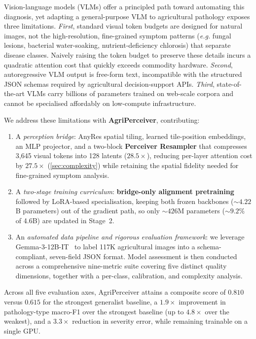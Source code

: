 \documentclass[runningheads]{llncs}
\newcommand{\ours}{AgriPerceiver}
\newcommand{\eg}{\textit{e.g.}}
\begin{document}
Vision-language models (VLMs) offer a principled path toward automating
this diagnosis, yet adapting a general-purpose VLM to agricultural pathology exposes three limitations.
\emph{First}, standard visual token budgets are designed for natural images, not the high-resolution, fine-grained symptom patterns (\eg{} fungal lesions, bacterial water-soaking, nutrient-deficiency chlorosis) that separate disease classes. Naively raising the token budget to preserve these details incurs a quadratic attention cost that quickly exceeds commodity hardware. \emph{Second}, autoregressive VLM output is free-form text, incompatible with the structured JSON schemas required by agricultural decision-support APIs. \emph{Third}, state-of-the-art VLMs carry billions of parameters trained on web-scale corpora and cannot be specialised affordably on low-compute infrastructure.

We address these limitations with \textbf{\ours{}}, contributing:

\begin{enumerate}[leftmargin=*,topsep=2pt,itemsep=2pt]
  \item A \emph{perception bridge}: AnyRes spatial tiling, learned
        tile-position embeddings, an MLP projector, and a two-block \textbf{Perceiver Resampler} that compresses 3,645 visual tokens into 128 latents ($28.5\times$), reducing per-layer attention cost by $27.5\times$ (\cref{sec:complexity}) while retaining the spatial fidelity needed for fine-grained symptom analysis.

  \item A \emph{two-stage training curriculum}: \textbf{bridge-only alignment
        pretraining} followed by LoRA-based specialisation, keeping both
        frozen backbones (${\sim}4.22$B parameters) out of the gradient
        path, so only ${\sim}426$M parameters (${\sim}9.2\%$ of 4.6B) are
        updated in Stage~2.

  \item An \emph{automated data pipeline and rigorous evaluation framework}:
        we leverage Gemma-3-12B-IT~\cite{gemmateam2025gemma3} to label 117K agricultural
        images into a schema-compliant, seven-field JSON format. Model assessment is then
        conducted across a comprehensive nine-metric suite covering five distinct quality dimensions, together with a per-class, calibration, and complexity analysis.
\end{enumerate}

Across all five evaluation axes, \ours{} attains a composite score of $0.810$ versus $0.615$ for the strongest generalist baseline, a $1.9\times$ improvement in pathology-type macro-F1 over the strongest baseline (up to $4.8\times$ over the weakest), and a $3.3\times$ reduction in severity error, while remaining trainable on a single GPU.
\end{document}
